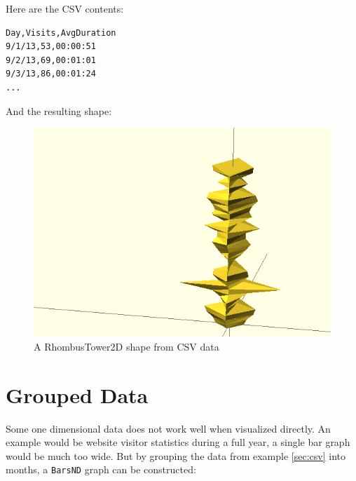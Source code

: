 \noindent Here are the CSV contents:

\vspace{.5\baselineskip}
\begin{verbatim}
Day,Visits,AvgDuration
9/1/13,53,00:00:51
9/2/13,69,00:01:01
9/3/13,86,00:01:24
...
\end{verbatim}
\vspace{.5\baselineskip}

\noindent And the resulting shape:

\begin{figure}[H]
	\centering
	\includegraphics[height=.20\textheight]{images/csv.png}
	\caption{A RhombusTower2D shape from CSV data}
	\label{img:angle_pie}
\end{figure}



\newpage
\section{Grouped Data}\label{sec:tower}

Some one dimensional data does not work well when visualized directly. An
example would be website visitor statistics during a full year, a single bar
graph would be much too wide. But by grouping the data from example
\ref{sec:csv} into months, a \texttt{BarsND} graph can be constructed:

